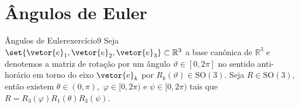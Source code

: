 \section{Ângulos de Euler}
\begin{proposition}{Ângulos de Euler}{exercício9}
    Seja \(\set{\vetor{e}_1, \vetor{e}_2, \vetor{e}_3}\subset \mathbb{R}^3\) a base canônica de \(\mathbb{R}^3\) e denotemos a matriz de rotação por um ângulo \(\vartheta \in [0,2\pi]\) no sentido anti-horário em torno do eixo \(\vetor{e}_k\) por \(R_k(\vartheta) \in \mathrm{SO}(3)\). Seja \(R \in \mathrm{SO}(3)\), então existem \(\theta \in (0,\pi),\) \(\varphi \in [0,2\pi)\) e \(\psi \in [0,2\pi)\) tais que \(R = R_3(\varphi)R_1(\theta)R_3(\psi)\).
\end{proposition}

